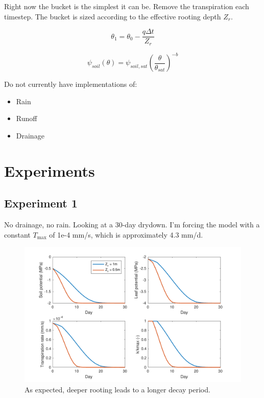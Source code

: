 \documentclass[11pt]{article}
\begin{document}
Right now the bucket is the simplest it can be. Remove the transpiration each timestep. The bucket is sized according to the effective rooting depth $Z_r$.

\begin{equation}
\theta_1 = \theta_0 - \dfrac{q\Delta t}{Z_r}
\end{equation}

\begin{equation}
\psi_{soil}\left(\theta\right) = \psi_{soil,sat}\left(\dfrac{\theta}{\theta_{sat}}\right)^{-b}
\end{equation}

Do not currently have implementations of:
\begin{itemize}
\item Rain
\item Runoff
\item Drainage
\end{itemize}


\clearpage
\section{Experiments}

\subsection{Experiment 1}
No drainage, no rain. Looking at a 30-day drydown. I'm forcing the model with a constant $T_\text{max}$ of 1e-4 mm/s, which is approximately 4.3 mm/d. 

\begin{figure}[h]
\centering
\includegraphics[width=35pc]{../figs/exp1}
\caption{As expected, deeper rooting leads to a longer decay period.}
\label{fig:soln}
\end{figure}





\clearpage

\nocite{*}


\end{document}
